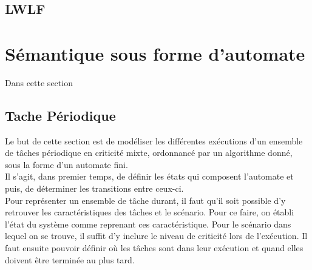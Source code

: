 \documentclass[11pt,a4paper,oneside]{book}
\theoremstyle{break}
\theoremstyle{breakplain}
\begin{document}
\section{LWLF}


\chapter{Sémantique sous forme d'automate}

Dans cette section

\section{Tache Périodique}

Le but de cette section est de modéliser les différentes exécutions d'un ensemble de tâches périodique en criticité mixte, ordonnancé par un algorithme donné, sous la forme d'un automate fini.\\
Il s'agit, dans premier temps, de définir les états qui composent l'automate et puis, de déterminer les transitions entre ceux-ci.\\

Pour représenter un ensemble de tâche durant, il faut qu'il soit possible d'y retrouver les caractéristiques des tâches et le scénario. Pour ce faire, on établi l'état du système comme reprenant ces caractéristique. Pour le scénario dans lequel on se trouve, il suffit d'y inclure le niveau de criticité lors de l'exécution. Il faut ensuite pouvoir définir où les tâches sont dans leur exécution et quand elles doivent être terminée au plus tard.
\end{document}
